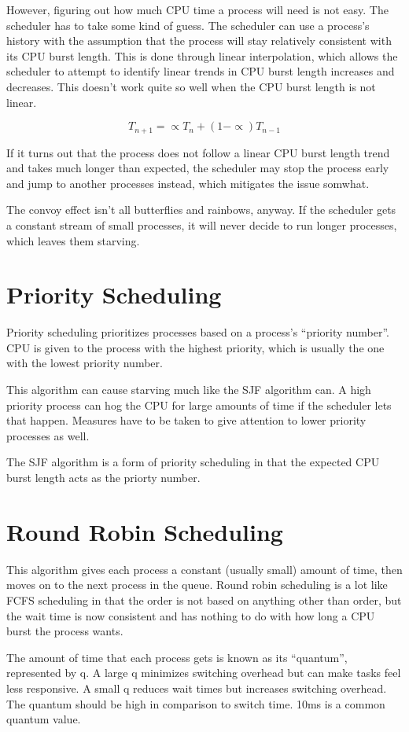 \documentclass{article}
\begin{document}
However, figuring out how much CPU time a process will need is not easy. The
scheduler has to take some kind of guess. The scheduler can use a process's
history with the assumption that the process will stay relatively consistent
with its CPU burst length. This is done through linear interpolation, which
allows the scheduler to attempt to identify linear trends in CPU burst length
increases and decreases. This doesn't work quite so well when the CPU burst
length is not linear.

$$T_{n+1} = \propto T_n + (1 - \propto) T_{n-1}$$

If it turns out that the process does not follow a linear CPU burst length
trend and takes much longer than expected, the scheduler may stop the process
early and jump to another processes instead, which mitigates the issue somwhat.

The convoy effect isn't all butterflies and rainbows, anyway. If the scheduler
gets a constant stream of small processes, it will never decide to run longer
processes, which leaves them starving.

\section{Priority Scheduling}
Priority scheduling prioritizes processes based on a process's ``priority
number''. CPU is given to the process with the highest priority, which is
usually the one with the lowest priority number.

This algorithm can cause starving much like the SJF algorithm can. A high
priority process can hog the CPU for large amounts of time if the scheduler
lets that happen. Measures have to be taken to give attention to lower priority
processes as well.

The SJF algorithm is a form of priority scheduling in that the expected CPU
burst length acts as the priorty number.

\section{Round Robin Scheduling}
This algorithm gives each process a constant (usually small) amount of time,
then moves on to the next process in the queue. Round robin scheduling is a lot
like FCFS scheduling in that the order is not based on anything other than
order, but the wait time is now consistent and has nothing to do with how long
a CPU burst the process wants.

The amount of time that each process gets is known as its ``quantum'',
represented by q. A large q minimizes switching overhead but can make tasks
feel less responsive. A small q reduces wait times but increases switching
overhead. The quantum should be high in comparison to switch time. 10ms is a
common quantum value.
\end{document}
